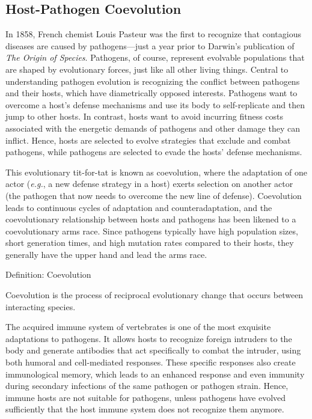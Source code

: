 \documentclass[
]{book}
\begin{document}
\hypertarget{host-pathogen-coevolution}{%
\subsection{Host-Pathogen Coevolution}\label{host-pathogen-coevolution}}

In 1858, French chemist Louis Pasteur was the first to recognize that contagious diseases are caused by pathogens---just a year prior to Darwin's publication of \emph{The Origin of Species}. Pathogens, of course, represent evolvable populations that are shaped by evolutionary forces, just like all other living things. Central to understanding pathogen evolution is recognizing the conflict between pathogens and their hosts, which have diametrically opposed interests. Pathogens want to overcome a host's defense mechanisms and use its body to self-replicate and then jump to other hosts. In contrast, hosts want to avoid incurring fitness costs associated with the energetic demands of pathogens and other damage they can inflict. Hence, hosts are selected to evolve strategies that exclude and combat pathogens, while pathogens are selected to evade the hosts' defense mechanisms.

This evolutionary tit-for-tat is known as coevolution, where the adaptation of one actor (\emph{e.g.}, a new defense strategy in a host) exerts selection on another actor (the pathogen that now needs to overcome the new line of defense). Coevolution leads to continuous cycles of adaptation and counteradaptation, and the coevolutionary relationship between hosts and pathogens has been likened to a coevolutionary arms race. Since pathogens typically have high population sizes, short generation times, and high mutation rates compared to their hosts, they generally have the upper hand and lead the arms race.

Definition: Coevolution

Coevolution is the process of reciprocal evolutionary change that occurs between interacting species.

The acquired immune system of vertebrates is one of the most exquisite adaptations to pathogens. It allows hosts to recognize foreign intruders to the body and generate antibodies that act specifically to combat the intruder, using both humoral and cell-mediated responses. These specific responses also create immunological memory, which leads to an enhanced response and even immunity during secondary infections of the same pathogen or pathogen strain. Hence, immune hosts are not suitable for pathogens, unless pathogens have evolved sufficiently that the host immune system does not recognize them anymore.
\end{document}
